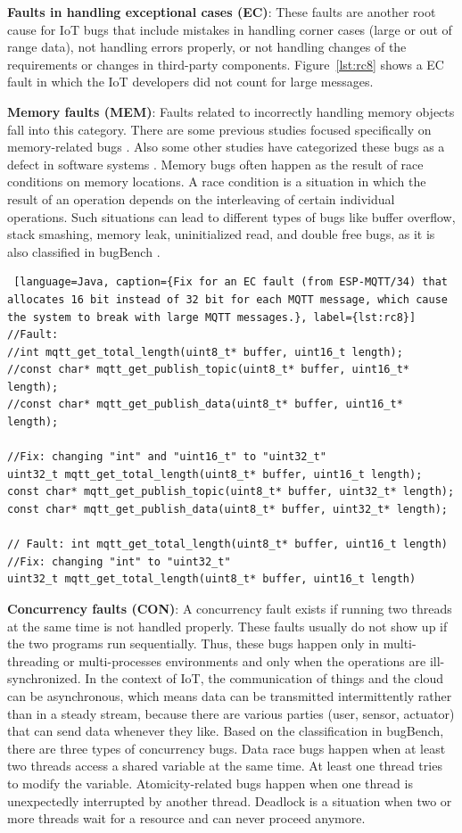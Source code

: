 \textbf{Faults in handling exceptional cases (EC)}: These faults are another root cause for IoT bugs that include mistakes in handling corner cases (large or out of range data), not handling errors properly, or not handling changes of the requirements or changes in third-party components. Figure~\autoref{lst:rc8} shows a EC fault in which the IoT developers did not count for large messages.

 
\textbf{Memory faults (MEM)}: Faults related to incorrectly handling memory objects fall into this category. There are some previous studies focused specifically on memory-related bugs \cite{memBugs}. Also some other studies have categorized these bugs as a defect in software systems \cite{openSourceBugs}. Memory bugs often happen as the result of race conditions on memory locations. A race condition is a situation in which the result of an operation depends on the interleaving of certain individual operations. Such situations can lead to different types of bugs like buffer overflow, stack smashing, memory leak, uninitialized read, and double free bugs, as it is also classified in bugBench \cite{bugBench}.

\begin{lstlisting} [language=Java, caption={Fix for an EC fault (from ESP-MQTT/34) that allocates 16 bit instead of 32 bit for each MQTT message, which cause the system to break with large MQTT messages.}, label={lst:rc8}] 
//Fault: 
//int mqtt_get_total_length(uint8_t* buffer, uint16_t length);
//const char* mqtt_get_publish_topic(uint8_t* buffer, uint16_t* length);
//const char* mqtt_get_publish_data(uint8_t* buffer, uint16_t* length);

//Fix: changing "int" and "uint16_t" to "uint32_t"
uint32_t mqtt_get_total_length(uint8_t* buffer, uint16_t length);
const char* mqtt_get_publish_topic(uint8_t* buffer, uint32_t* length);
const char* mqtt_get_publish_data(uint8_t* buffer, uint32_t* length);

// Fault: int mqtt_get_total_length(uint8_t* buffer, uint16_t length)
//Fix: changing "int" to "uint32_t"
uint32_t mqtt_get_total_length(uint8_t* buffer, uint16_t length)
\end{lstlisting}


\textbf{Concurrency faults (CON)}: A concurrency fault exists if running two threads at the same time is not handled properly. These faults usually do not show up if the two programs run sequentially. Thus, these bugs happen only in multi-threading or multi-processes environments and only when the operations are ill-synchronized. In the context of IoT, the communication of things and the cloud can be asynchronous, which means data can be transmitted intermittently rather than in a steady stream, because there are various parties (user, sensor, actuator) that can send data whenever they like. Based on the classification in bugBench, there are three types of concurrency bugs. Data race bugs happen when at least two threads access a shared variable at the same time. At least one thread tries to modify the variable. Atomicity-related bugs happen when one thread is unexpectedly interrupted by another thread. Deadlock is a situation when two or more threads wait for a resource and can never proceed anymore. 


